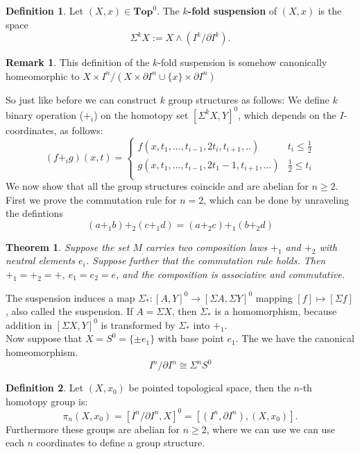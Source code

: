 \documentclass{article}
\newtheorem{theorem}{Theorem}[section]
\theoremstyle{definition}
\newtheorem{remark}{Remark}
\newtheorem{defn}{Definition}[section]
\newcommand{\cat}{\mathbf}
\begin{document}
  \begin{defn}
   Let $(X,x)\in\cat{Top}^{0}$. The \textbf{$k$-fold suspension} of $(X,x)$ is the space \[\Sigma^k X:=X\wedge  (I^k/\partial I^k).\]
  \end{defn}
  \begin{remark}
  This definition of the $k$-fold suspension is somehow canonically homeomorphic to $X\times I^n/(X\times\partial I^n\cup\{x\}\times \partial I^n)$
  \end{remark}
  So just like before we can construct  $k$ group structures as follows: We define  $k$ binary operation ($+_i$) on the homotopy set $[\Sigma^k X, Y]^0$, which depends on the $I$-coordinates, as follows:$$(f+_i g)(x,t)= \begin{cases} 
      f(x,t_1, ..., t_{i-1},2t_i, t_{i+1},..) & t_i\leq \frac{1}{2} \\
      g(x,t_1, ..., t_{i-1},2t_1-1, t_{i+1},...) & \frac{1}{2}\leq t_i \\
   \end{cases}$$
   We now show that all the group structures coincide and are abelian for $n\geq 2$. First we prove the commutation rule for $n=2$, which can be done by unraveling the defintions $$(a+_1 b)+_2(c+_1 d)=(a+_2 c)+_1(b+_2d)$$
   \begin{theorem}
   Suppose the set $M$ carries two composition laws $+_1$ and $+_2$ with neutral elements $e_i$. Suppose further that the commutation rule holds. Then $+_1=+_2=+$, $e_1=e_2=e$, and the composition is associative and commutative. 
   \end{theorem}
   The suspension induces a map $\Sigma_*:[A,Y]^0 \rightarrow [\Sigma A,\Sigma Y]^0$ mapping $[f]\mapsto [\Sigma f]$, also called the suspension. If $A=\Sigma X$, then $\Sigma _*$ is a homomorphism, because addition in $[\Sigma X, Y]^0$ is transformed by $\Sigma_*$ into $+_1$. \\ Now suppose that $X=S^{0}=\{\pm e_1\}$ with base point $e_1$. The we have the canonical homeomorphism. $$I^{n}/\partial I^{n}\cong \Sigma^n S^0$$
   \begin{defn}
   Let $(X,x_0)$ be pointed topological space, then the $n$-th homotopy group is: $$\pi_n(X,x_0)=[I^n/\partial I^n,X]^0=[(I^n,\partial I^n), (X,x_0)].$$ Furthermore these groups are abelian for $n\geq 2$, where we can use we can use each $n$ coordinates to define a group structure.  
   \end{defn}
\end{document}

